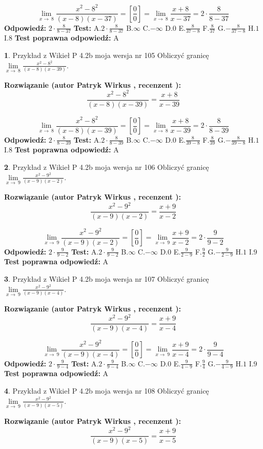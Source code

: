 \documentclass[12pt, a4paper]{article}
\theoremstyle{definition} %
\newtheorem{zad}{}
\newcommand{\zadStart}[1]{\begin{zad}#1\newline}
\newcommand{\zadStop}{\end{zad}}
\newcommand{\rozwStart}[2]{\noindent \textbf{Rozwiązanie (autor #1 , recenzent #2): }\newline}
\newcommand{\rozwStop}{\newline}
\newcommand{\odpStart}{\noindent \textbf{Odpowiedź:}\newline}
\newcommand{\odpStop}{\newline}
\newcommand{\testStart}{\noindent \textbf{Test:}\newline}
\newcommand{\testStop}{\newline}
\newcommand{\kluczStart}{\noindent \textbf{Test poprawna odpowiedź:}\newline}
\newcommand{\kluczStop}{\newline}
\begin{document}
$$\lim\limits_{x\to\ 8}\frac{x^{2}-8^{2}}{(x-8)(x-37)}=[\frac{0}{0}]=\lim\limits_{x\to\ 8}\frac{x+8}{x-37}=2 \cdot \frac{8}{8-37}$$
\rozwStop
\odpStart
$2 \cdot \frac{8}{8-37}$
\odpStop
\testStart
A.$2 \cdot \frac{8}{8-37}$
B.$\infty$
C.$-\infty$
D.$0$
E.$\frac{8}{37-8}$
F.$\frac{8}{37}$
G.$-\frac{8}{37-8}$
H.$1$
I.$8$
\testStop
\kluczStart
A
\kluczStop



\zadStart{Przykład z Wikieł P 4.2b moja wersja nr 105}
Obliczyć granicę $\lim\limits_{x\to\ 8}\frac{x^{2}-8^{2}}{(x-8)(x-39)}$.
\zadStop
\rozwStart{Patryk Wirkus}{}
$$\frac{x^{2}-8^{2}}{(x-8)(x-39)}=\frac{x+8}{x-39}$$

$$\lim\limits_{x\to\ 8}\frac{x^{2}-8^{2}}{(x-8)(x-39)}=[\frac{0}{0}]=\lim\limits_{x\to\ 8}\frac{x+8}{x-39}=2 \cdot \frac{8}{8-39}$$
\rozwStop
\odpStart
$2 \cdot \frac{8}{8-39}$
\odpStop
\testStart
A.$2 \cdot \frac{8}{8-39}$
B.$\infty$
C.$-\infty$
D.$0$
E.$\frac{8}{39-8}$
F.$\frac{8}{39}$
G.$-\frac{8}{39-8}$
H.$1$
I.$8$
\testStop
\kluczStart
A
\kluczStop



\zadStart{Przykład z Wikieł P 4.2b moja wersja nr 106}
Obliczyć granicę $\lim\limits_{x\to\ 9}\frac{x^{2}-9^{2}}{(x-9)(x-2)}$.
\zadStop
\rozwStart{Patryk Wirkus}{}
$$\frac{x^{2}-9^{2}}{(x-9)(x-2)}=\frac{x+9}{x-2}$$

$$\lim\limits_{x\to\ 9}\frac{x^{2}-9^{2}}{(x-9)(x-2)}=[\frac{0}{0}]=\lim\limits_{x\to\ 9}\frac{x+9}{x-2}=2 \cdot \frac{9}{9-2}$$
\rozwStop
\odpStart
$2 \cdot \frac{9}{9-2}$
\odpStop
\testStart
A.$2 \cdot \frac{9}{9-2}$
B.$\infty$
C.$-\infty$
D.$0$
E.$\frac{9}{2-9}$
F.$\frac{9}{2}$
G.$-\frac{9}{2-9}$
H.$1$
I.$9$
\testStop
\kluczStart
A
\kluczStop



\zadStart{Przykład z Wikieł P 4.2b moja wersja nr 107}
Obliczyć granicę $\lim\limits_{x\to\ 9}\frac{x^{2}-9^{2}}{(x-9)(x-4)}$.
\zadStop
\rozwStart{Patryk Wirkus}{}
$$\frac{x^{2}-9^{2}}{(x-9)(x-4)}=\frac{x+9}{x-4}$$

$$\lim\limits_{x\to\ 9}\frac{x^{2}-9^{2}}{(x-9)(x-4)}=[\frac{0}{0}]=\lim\limits_{x\to\ 9}\frac{x+9}{x-4}=2 \cdot \frac{9}{9-4}$$
\rozwStop
\odpStart
$2 \cdot \frac{9}{9-4}$
\odpStop
\testStart
A.$2 \cdot \frac{9}{9-4}$
B.$\infty$
C.$-\infty$
D.$0$
E.$\frac{9}{4-9}$
F.$\frac{9}{4}$
G.$-\frac{9}{4-9}$
H.$1$
I.$9$
\testStop
\kluczStart
A
\kluczStop



\zadStart{Przykład z Wikieł P 4.2b moja wersja nr 108}
Obliczyć granicę $\lim\limits_{x\to\ 9}\frac{x^{2}-9^{2}}{(x-9)(x-5)}$.
\zadStop
\rozwStart{Patryk Wirkus}{}
$$\frac{x^{2}-9^{2}}{(x-9)(x-5)}=\frac{x+9}{x-5}$$
\end{document}
